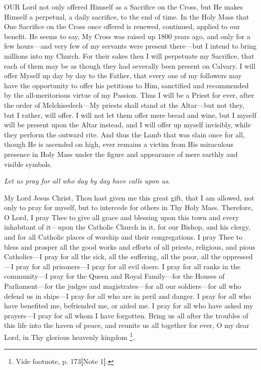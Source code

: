 
OUR Lord not only
offered Himself as a Sacrifice on the Cross, but He makes Himself a
perpetual, a daily sacrifice, to the end of time. In the Holy Mass that
One Sacrifice on the Cross once offered is renewed, continued, applied
to our benefit. He seems to say, My Cross was raised up 1800 years ago,
and only for a few hours—and very few of my servants were present
there—but I intend to bring millions into my Church. For their sakes
then I will perpetuate my Sacrifice, that each of them may be as though
they had severally been present on Calvary. I will offer Myself up day
by day to the Father, that every one of my followers may have the
opportunity to offer his petitions to Him, sanctified and recommended by
the all-meritorious virtue of my Passion. Thus I will be a Priest for
ever, after the order of Melchisedech—My priests shall stand at the
Altar—but not they, but I rather, will offer. I will not let them
offer mere bread and wine, but I myself will be present upon the Altar
instead, and I will offer up myself invisibly, while they perform the
outward rite. And thus the Lamb that was slain once for all, though He
is ascended on high, ever remains a victim from His miraculous presence
in Holy Mass under the figure and appearance of mere earthly and visible
symbols.

\emph{Let us pray for all who day
by day have calls upon us}.

My Lord Jesus Christ, Thou hast
given me this great gift, that I am allowed, not only to pray for
myself, but to intercede for others in Thy Holy Mass. Therefore, O Lord,
I pray Thee to give all grace and blessing upon this town and every
inhabitant of it—upon the Catholic Church in it, for our Bishop, and
his clergy, and for all Catholic places of worship and their
congregations. I pray Thee to bless and prosper all the good works and
efforts of all priests, religious, and pious Catholics—I pray for all
the sick, all the suffering, all the poor, all the oppressed—I pray
for all prisoners—I pray for all evil doers. I pray for all ranks in
the community—I pray for the Queen and Royal Family—for the Houses
of Parliament—for the judges and magistrates—for all our
soldiers—for all who defend us in ships—I pray for all who are in
peril and danger. I pray for all who have benefited me, befriended me,
or aided me. I pray for all who have asked my prayers—I pray for all
whom I have forgotten. Bring us all after the troubles of this life into
the haven of peace, and reunite us all together for ever, O my dear
Lord, in Thy glorious heavenly kingdom \footnote{Vide footnote, p. 173\textbf{[}Note 1\textbf{]}.}.

